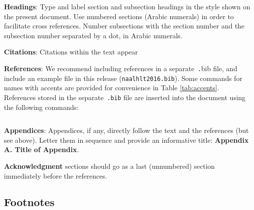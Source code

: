 \documentclass[11pt,letterpaper]{article}
\newcommand\BibTeX{B{\sc ib}\TeX}
\begin{document}
{\bf Headings}: Type and label section and subsection headings in the
style shown on the present document.  Use numbered sections (Arabic
numerals) in order to facilitate cross references. Number subsections
with the section number and the subsection number separated by a dot,
in Arabic numerals. 

{\bf Citations}: Citations within the text appear

\textbf{References}:  We recommend
including references in a separate~{\small\texttt .bib} file, and include an example file 
in this release ({\small\tt naalhlt2016.bib}).  Some commands
for names with accents are provided for convenience in Table \ref{tab:accents}.  
References stored in the separate~{\small\tt .bib} file are inserted into the document using the following commands:

\small
\begin{verbatim}
\end{verbatim}
\normalsize 





{\bf Appendices}: Appendices, if any, directly follow the text and the
references (but see above).  Letter them in sequence and provide an
informative title: {\bf Appendix A. Title of Appendix}.

\textbf{Acknowledgment} sections should go as a last (unnumbered) section immediately
before the references.  


\subsection{Footnotes}
\end{document}
